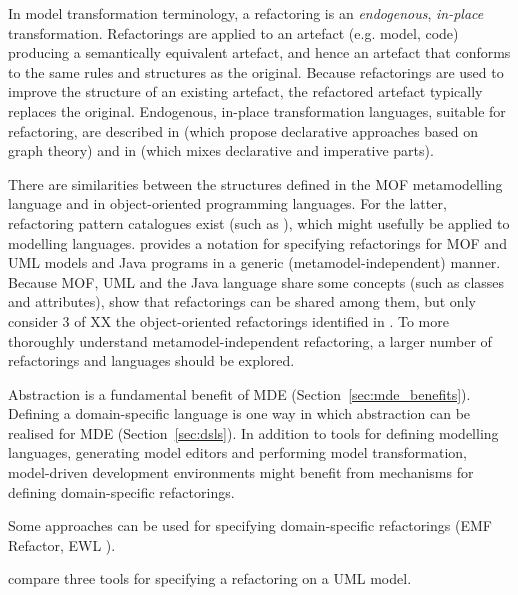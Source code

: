 In model transformation terminology, a refactoring is an \emph{endogenous}, \emph{in-place} transformation. Refactorings are applied to an artefact (e.g. model, code) producing a semantically equivalent artefact, and hence an artefact that conforms to the same rules and structures as the original. Because refactorings are used to improve the structure of an existing artefact, the refactored artefact typically replaces the original. Endogenous, in-place transformation languages, suitable for refactoring, are described in \cite{biermann06refactoring,porres03refactoring} (which propose declarative approaches based on graph theory) and in \cite{kolovos07ewl} (which mixes declarative and imperative parts).

There are similarities between the structures defined in the MOF metamodelling language and in object-oriented programming languages. For the latter, refactoring pattern catalogues exist (such as \cite{fowler99refactoring}), which might usefully be applied to modelling languages. \cite{moha09refactoring} provides a notation for specifying refactorings for MOF and UML models and Java programs in a generic (metamodel-independent) manner. Because MOF, UML and the Java language share some concepts (such as classes and attributes), \cite{moha09refactoring} show that refactorings can be shared among them, but only consider 3 of XX the object-oriented refactorings identified in \cite{fowler99refactoring}. To more thoroughly understand metamodel-independent refactoring, a larger number of refactorings and languages should be explored.

Abstraction is a fundamental benefit of MDE (Section~\ref{sec:mde_benefits}). Defining a domain-specific language is one way in which abstraction can be realised for MDE (Section~\ref{sec:dsls}). In addition to tools for defining modelling languages, generating model editors and performing model transformation, model-driven development environments might benefit from mechanisms for defining domain-specific refactorings. 


Some approaches can be used for specifying domain-specific refactorings (EMF Refactor, EWL \cite{kolovos07ewl}).

\cite{arendt09refactoring} compare three tools for specifying a refactoring on a UML model. 


 



